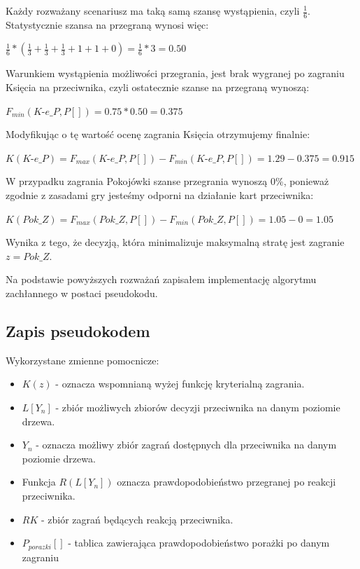 Każdy rozważany scenariusz ma taką samą szansę wystąpienia, czyli $\frac{1}{6}$. Statystycznie szansa na przegraną wynosi więc:
\begin{center}
 $\frac{1}{6} * (\frac{1}{3} + \frac{1}{3} + \frac{1}{3} + 1 + 1 + 0) = \frac{1}{6} * 3 = 0.50 $
\end{center}
Warunkiem wystąpienia możliwości przegrania, jest brak wygranej po zagraniu Księcia na przeciwnika, czyli ostatecznie szanse na przegraną wynoszą:
\begin{center}
	$F_{min}(\textit{K-e\_P}, P[]) = 0.75 * 0.50 = 0.375$
\end{center}
Modyfikując o tę wartość ocenę zagrania Księcia otrzymujemy finalnie:
\begin{center}
	$K(\textit{K-e\_P}) =  F_{max}(\textit{K-e\_P}, P[]) - F_{min}(\textit{K-e\_P}, P[]) = 1.29 - 0.375 = 0.915$
\end{center} 
W przypadku zagrania Pokojówki szanse przegrania wynoszą 0\%, ponieważ zgodnie z zasadami gry jesteśmy odporni na działanie kart przeciwnika:
\begin{center}
	$K(Pok\_Z) =  F_{max}(Pok\_Z, P[]) - F_{min}(Pok\_Z, P[]) = 1.05 - 0 = 1.05$
\end{center} 
Wynika z tego, że decyzją, która minimalizuje maksymalną stratę jest zagranie $z = Pok\_Z$.

Na podstawie powyższych rozważań zapisałem implementację algorytmu zachłannego w postaci pseudokodu.
\subsection{Zapis pseudokodem}
Wykorzystane zmienne pomocnicze:
\begin{itemize}
	\item $K(z)$ - oznacza wspomnianą wyżej funkcję kryterialną zagrania. 
	\item $L[Y_n]$ - zbiór możliwych zbiorów decyzji przeciwnika na danym poziomie drzewa.	
	\item $Y_n$ - oznacza możliwy zbiór zagrań dostępnych dla przeciwnika na danym poziomie drzewa.
	\item Funkcja $R(L[Y_n])$ oznacza prawdopodobieństwo przegranej po reakcji przeciwnika.
	\item $RK$ - zbiór zagrań będących reakcją przeciwnika.
	\item $P_{porazki}[]$ - tablica zawierająca prawdopodobieństwo porażki po danym zagraniu
\end{itemize}

